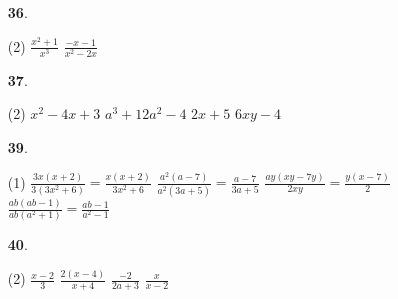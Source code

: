 \documentclass[a4paper, pdf, twoside]{book}
\begin{document}
\begin{multicols}{2}
\begin{enumerate}
 \item[\fontfamily{phv}\selectfont\color{blue}\textbf{36}. ]  \scalebox{0.6}{\simbolclau } 
 \begin{tasks}[column-sep=1em, item-indent=1.3333em](2)
	 \task $\frac {x^2+1}{x^3}$
	 \task $\frac {-x-1}{x^2-2x}$
\end{tasks}
\vspace{0.25cm}



 \item[\fontfamily{phv}\selectfont\color{blue}\textbf{37}. ] 
 \begin{tasks}[column-sep=1em, item-indent=1.3333em](2)
	 \task $x^2-4x+3$
	 \task $a^3+12a^2-4$
	 \task $2x+5$
	 \task $6xy-4$
\end{tasks}
\vspace{0.25cm}



 \item[\fontfamily{phv}\selectfont\color{blue}\textbf{39}. ] 
 \begin{tasks}[column-sep=1em, item-indent=1.3333em](1)
	 \task* $\frac {3x(x+2)}{3(3x^2+6)}=\frac {x(x+2)}{3x^2+6}$
	 \task* $\frac {a^2(a-7)}{a^2(3a+5)}=\frac {a-7}{3a+5}$
	 \task* $\frac {ay(xy-7y)}{2xy}=\frac {y(x-7)}{2}$
	 \task* $\frac {ab(ab-1)}{ab(a^2+1)}=\frac {ab-1}{a^2-1}$
\end{tasks}
\vspace{0.25cm}



 \item[\fontfamily{phv}\selectfont\color{blue}\textbf{40}. ]  \scalebox{0.6}{\simbolclau } 
 \begin{tasks}[column-sep=1em, item-indent=1.3333em](2)
	 \task $\frac {x-2}{3}$
	 \task $\frac {2(x-4)}{x+4}$
	 \task $\frac {-2}{2a+3}$
	 \task $\frac {x}{x-2}$
\end{tasks}
 \end{enumerate}
\vspace{0.3cm}



\end{multicols}
\end{document}
